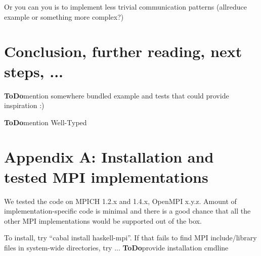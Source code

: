 \documentclass{tmr}
\newcommand{\ToDo}[1]{\textbf{ToDo}{#1}}
\begin{document}
Or you can you is to implement less trivial communication patterns (allreduce example or something more complex?)


\section{Conclusion, further reading, next steps, ...}

\ToDo mention somewhere bundled example and tests that could provide inspiration :)

\ToDo mention Well-Typed

\section{Appendix A: Installation and tested MPI implementations}
We tested the code on MPICH 1.2.x and 1.4.x, OpenMPI x.y.z. Amount of implementation-specific code is minimal and there is a good chance that all the other MPI implementations would be supported out of the box.

To install, try ``cabal install haskell-mpi''. If that fails to find MPI include/library files in system-wide directories, try ...
\ToDo provide installation cmdline


\end{document}
